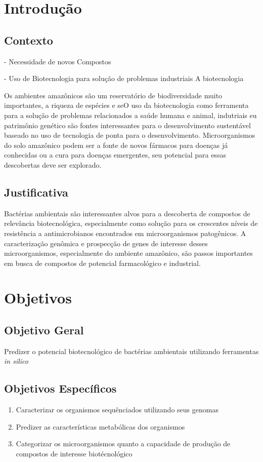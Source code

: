 \chapter{Introdução}
\label{cap:introducao}

\section{Contexto}


- Necessidade de novos Compostos

- Uso de Biotecnologia para solução de problemas industriais
A biotecnologia 

Os ambientes amazônicos são um reservatório de biodiversidade muito importantes,
a riqueza de espécies e seO uso da biotecnologia como ferramenta para a solução de problemas relacionados
a saúde humana e animal, indutriais eu patrimônio genético são fontes interessantes para o
desenvolvimento sustentável baseado no uso de tecnologia de ponta para o desenvolvimento.
Microorganismos do solo amazônico podem ser a fonte de novos fármacos para doenças já conhecidas
ou a cura para doenças emergentes, seu potencial para essas descobertas deve ser explorado.

\section{Justificativa}
Bactérias ambientais são interessantes alvos para a descoberta de compostos
de relevância biotecnológica, especialmente como solução para os crescentes níveis
de resistência a antimicrobianos encontrados em microorganismos patogênicos.
A caracterização genômica e prospecção de genes de interesse desses microorganismos,
especialmente do ambiente amazônico, são passos importantes
em busca de compostos de potencial farmacológico e industrial.

\chapter{Objetivos}

\section{Objetivo Geral}

Predizer o potencial biotecnológico de bactérias ambientais utilizando 
ferramentas \textit{in silico} 

\section{Objetivos Específicos}
\begin{enumerate}
    \item Caracterizar os organismos sequênciados utilizando seus genomas
    \item Predizer as características metabólicas dos organismos
    \item Categorizar os microorganismos quanto a capacidade de produção de compostos de interesse biotécnológico
\end{enumerate}





